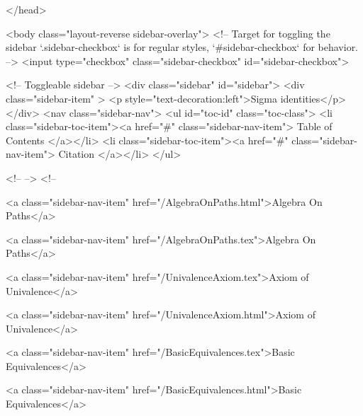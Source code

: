   
</head>




  <body class="layout-reverse sidebar-overlay">
    <!-- Target for toggling the sidebar `.sidebar-checkbox` is for regular
     styles, `#sidebar-checkbox` for behavior. -->
<input type="checkbox" class="sidebar-checkbox" id="sidebar-checkbox">

<!-- Toggleable sidebar -->
<div class="sidebar" id="sidebar">
  <div class="sidebar-item" >
    <p style="text-decoration:left">Sigma identities</p>
  </div>
  <nav class="sidebar-nav">
    <ul id="toc-id" class="toc-class">
  <li class="sidebar-toc-item"><a href="#" class="sidebar-nav-item"> Table of Contents </a></li>
  <li class="sidebar-toc-item"><a href="#" class="sidebar-nav-item"> Citation </a></li>
</ul>


    <!--  -->
    <!-- 
      
    
      
    
      
    
      
    
      
        
      
    
      
        
          <a class="sidebar-nav-item" href="/AlgebraOnPaths.html">Algebra On Paths</a>
        
      
    
      
        
          <a class="sidebar-nav-item" href="/AlgebraOnPaths.tex">Algebra On Paths</a>
        
      
    
      
        
          <a class="sidebar-nav-item" href="/UnivalenceAxiom.tex">Axiom of Univalence</a>
        
      
    
      
        
          <a class="sidebar-nav-item" href="/UnivalenceAxiom.html">Axiom of Univalence</a>
        
      
    
      
        
          <a class="sidebar-nav-item" href="/BasicEquivalences.tex">Basic Equivalences</a>
        
      
    
      
        
          <a class="sidebar-nav-item" href="/BasicEquivalences.html">Basic Equivalences</a>
        
